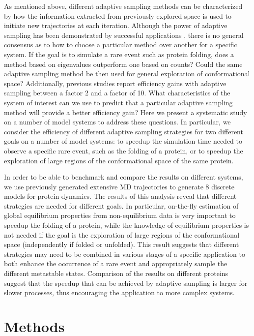 As mentioned above, different adaptive sampling methods can be characterized by how the
information extracted from previously explored space is used to
initiate new trajectories at each iteration.
Although the power of adaptive sampling has been demonstrated by successful
applications \cite{Wieczorek2016,Plattner20171005,Kohlhoff201415}, there is no general consensus as to how to
choose a particular method over another for a specific system. If the goal is
to simulate a rare event such as protein folding, does a method based on eigenvalues
outperform one based on counts? Could the same adaptive sampling method be then
used for general exploration of conformational space? Additionally, previous
studies \cite{preto2014fast,weber2011characterization,bowman2010enhanced,Fabritiis-2014} report efficiency gains with
adaptive sampling between a factor 2 and a factor of 10. What characteristics of the system of
interest can we use to predict that a particular adaptive sampling method will
provide a better efficiency gain?  Here we present a systematic study on a
number of model systems to address these questions.
In particular, we consider the efficiency of different adaptive sampling strategies for
two different goals on a number of model systems: to speedup the simulation
time needed to observe a specific rare event, such as the folding of a protein,
or to speedup the exploration of large regions of the conformational space of
the same protein.

In order to be able to benchmark and compare the results on different systems, we
use previously generated extensive MD trajectories \cite{lindorff2011} to
generate 8 discrete models for protein dynamics.
The results of this analysis reveal that different strategies are needed
for different goals. In particular, on-the-fly estimation of global
equilibrium properties from non-equilibrium data is very important to speedup
the folding of a protein, while the knowledge of equilibrium properties is not
needed if the goal is the exploration of large regions of the conformational
space (independently if folded or unfolded). This result suggests that
different strategies may need to
be combined in various stages of a specific application to both enhance the
occurrence of a rare event and appropriately sample the different metastable states.
Comparison of the results on different proteins
suggest that the speedup that can be achieved by adaptive sampling is larger
for slower processes, thus encouraging the application to more complex systems.


\section{\label{sec:methods}Methods}

